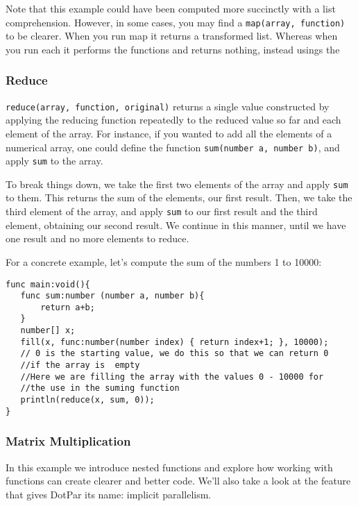 \documentclass{article}
\begin{document}
Note that this example could have been computed more succinctly with a list comprehension. However, in some cases, you may find a \verb=map(array, function)= to be clearer. When you run map it returns a transformed list. Whereas when you run each it performs the functions and returns nothing, instead usings the 

\subsubsection{Reduce}
\verb=reduce(array, function, original)= returns a single value constructed by applying the reducing function repeatedly to the reduced value so far and each element of the array. For instance, if you wanted to add all the elements of a numerical array, one could define the function \verb=sum(number a, number b)=, and apply \verb=sum= to the array.

To break things down, we take the first two elements of the array and apply \verb=sum= to them. This returns the sum of the elements, our first result. Then, we take the third element of the array, and apply \verb=sum= to our first result and the third element, obtaining our second result. We continue in this manner, until we have one result and no more elements to reduce.

For a concrete example, let's compute the sum of the numbers 1 to 10000:

\begin{verbatim}
func main:void(){
   func sum:number (number a, number b){
       return a+b;
   }
   number[] x;
   fill(x, func:number(number index) { return index+1; }, 10000);
   // 0 is the starting value, we do this so that we can return 0 
   //if the array is  empty
   //Here we are filling the array with the values 0 - 10000 for 
   //the use in the suming function
   println(reduce(x, sum, 0));
}
\end{verbatim}

\subsubsection{Matrix Multiplication}
In this example we introduce nested functions and explore how working with functions can create clearer and better code. We'll also take a look at the feature that gives DotPar its name: implicit parallelism.
\end{document}
